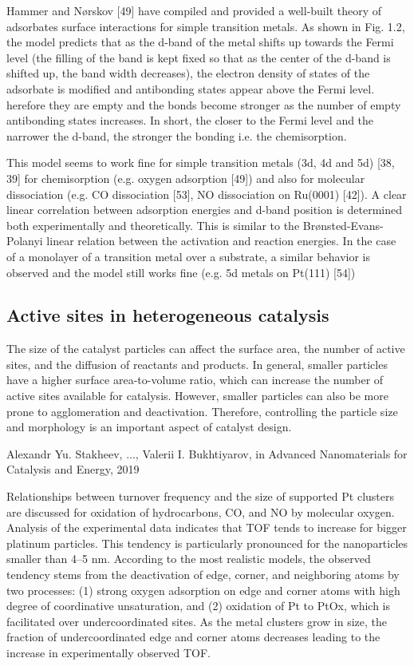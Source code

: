 Hammer and Nørskov [49] have compiled and provided a well-built theory of adsorbates
surface interactions for simple transition metals.
As shown in Fig. 1.2, the model predicts that as the d-band of the metal shifts up towards the Fermi level (the filling of the band is kept fixed so that as the center of the d-band is shifted up, the band width decreases), the electron density of states of the adsorbate is modified and antibonding states appear above the Fermi level.
herefore they are empty and the bonds become stronger as the number of empty antibonding states increases.
In short, the closer to the Fermi level and the narrower the d-band, the stronger the bonding i.e. the chemisorption.

This model seems to work fine for simple transition metals (3d, 4d and 5d) [38, 39] for chemisorption (e.g. oxygen adsorption [49]) and also for molecular dissociation (e.g. CO dissociation [53], NO dissociation on Ru(0001) [42]).
A clear linear correlation between adsorption energies and d-band position is determined both experimentally and theoretically.
This is similar to the Brønsted-Evans-Polanyi linear relation between the activation and reaction energies.
In the case of a monolayer of a transition metal over a substrate, a similar behavior is observed and the model still works fine (e.g. 5d metals on Pt(111) [54])

\subsection{Active sites in heterogeneous catalysis}

The size of the catalyst particles can affect the surface area, the number of active sites, and the diffusion of reactants and products.
In general, smaller particles have a higher surface area-to-volume ratio, which can increase the number of active sites available for catalysis.
However, smaller particles can also be more prone to agglomeration and deactivation. Therefore, controlling the particle size and morphology is an important aspect of catalyst design.

Alexandr Yu. Stakheev, ..., Valerii I. Bukhtiyarov, in Advanced Nanomaterials for Catalysis and Energy, 2019

Relationships between turnover frequency and the size of supported Pt clusters are discussed for oxidation of hydrocarbons, CO, and NO by molecular oxygen.
Analysis of the experimental data indicates that TOF tends to increase for bigger platinum particles.
This tendency is particularly pronounced for the nanoparticles smaller than 4–5 nm. According to the most realistic models, the observed tendency stems from the deactivation of edge, corner, and neighboring atoms by two processes: (1) strong oxygen adsorption on edge and corner atoms with high degree of coordinative unsaturation, and (2) oxidation of Pt to PtOx, which is facilitated over undercoordinated sites.
As the metal clusters grow in size, the fraction of undercoordinated edge and corner atoms decreases leading to the increase in experimentally observed TOF.

